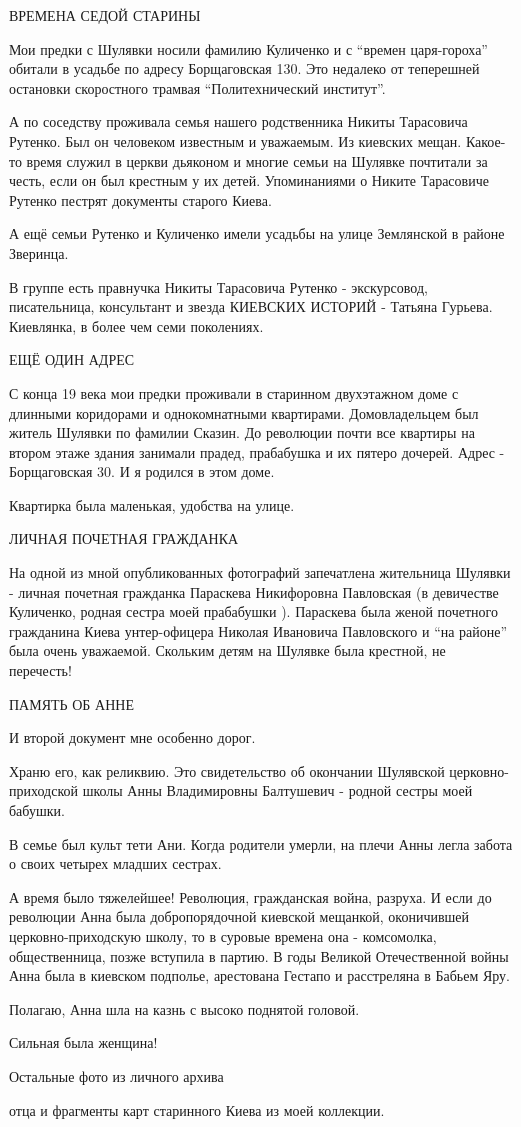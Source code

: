 ВРЕМЕНА СЕДОЙ СТАРИНЫ

Мои предки с Шулявки носили фамилию Куличенко и с \enquote{времен царя-гороха} обитали
в усадьбе по адресу Борщаговская 130. Это недалеко от теперешней остановки
скоростного трамвая \enquote{Политехнический институт}.

А по соседству проживала семья нашего родственника Никиты Тарасовича Рутенко.
Был он человеком известным и уважаемым. Из киевских мещан. Какое-то время
служил в церкви дьяконом и многие семьи на Шулявке почтитали за честь, если он
был крестным у их детей. Упоминаниями о Никите Тарасовиче Рутенко пестрят
документы старого Киева.

А ещё семьи Рутенко и Куличенко имели усадьбы на улице Землянской в районе
Зверинца.

В группе есть правнучка Никиты Тарасовича Рутенко - экскурсовод, писательница,
консультант и звезда КИЕВСКИХ ИСТОРИЙ - Татьяна Гурьева. Киевлянка, в более чем
семи поколениях.

ЕЩЁ ОДИН АДРЕС

С конца 19 века мои предки проживали в старинном двухэтажном доме с длинными
коридорами и однокомнатными квартирами. Домовладельцем был житель Шулявки по
фамилии Сказин. До революции почти все квартиры на втором этаже здания занимали
прадед, прабабушка и их пятеро дочерей. Адрес - Борщаговская 30. И я родился в
этом доме.

Квартирка была маленькая, удобства на улице.

ЛИЧНАЯ ПОЧЕТНАЯ ГРАЖДАНКА

На одной из мной опубликованных фотографий запечатлена жительница Шулявки -
личная почетная гражданка Параскева Никифоровна Павловская (в девичестве
Куличенко, родная сестра моей прабабушки ). Параскева была женой почетного
гражданина Киева унтер-офицера Николая Ивановича Павловского и \enquote{на районе} была
очень уважаемой. Скольким детям на Шулявке была крестной, не перечесть!

ПАМЯТЬ ОБ АННЕ

И второй документ мне особенно дорог.

Храню его, как реликвию. Это свидетельство об окончании Шулявской
церковно-приходской школы Анны Владимировны Балтушевич - родной сестры моей
бабушки.

В семье был культ тети Ани. Когда родители умерли, на плечи Анны легла забота о
своих четырех  младших сестрах.

А время было тяжелейшее! Революция, гражданская война, разруха. И если  до
революции Анна была добропорядочной киевской мещанкой, оконичившей
церковно-приходскую школу, то в суровые времена она - комсомолка,
общественница, позже вступила в партию. В годы Великой Отечественной войны Анна
была в киевском подполье, арестована Гестапо и расстреляна в Бабьем Яру. 

Полагаю, Анна шла на казнь с высоко поднятой головой. 

Сильная была женщина!

Остальные фото из личного архива 

отца и фрагменты карт старинного Киева из моей коллекции.
